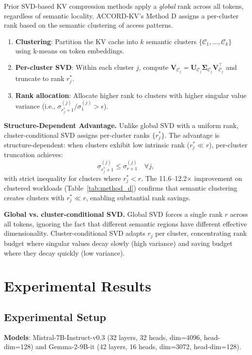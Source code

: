 \documentclass[11pt, a4paper, oneside]{article}
\theoremstyle{myplain}
\theoremstyle{mydefinition}
\theoremstyle{myremark}
\begin{document}
Prior SVD-based KV compression methods apply a \textit{global} rank across all tokens, regardless of semantic locality. ACCORD-KV's Method D assigns a per-cluster rank based on the semantic clustering of access patterns.

\begin{enumerate}
    \item \textbf{Clustering}: Partition the KV cache into $k$ semantic clusters $\{\mathcal{C}_1, \ldots, \mathcal{C}_k\}$ using k-means on token embeddings.
    \item \textbf{Per-cluster SVD}: Within each cluster $j$, compute $\mathbf{V}_{\mathcal{C}_j} = \mathbf{U}_{\mathcal{C}_j} \mathbf{\Sigma}_{\mathcal{C}_j} \mathbf{V}_{\mathcal{C}_j}^\top$ and truncate to rank $r_j^*$.
    \item \textbf{Rank allocation}: Allocate higher rank to clusters with higher singular value variance (i.e., $\sigma_{r_j^*+1}^{(j)} / \sigma_1^{(j)} > \epsilon$).
\end{enumerate}

\textbf{Structure-Dependent Advantage.} Unlike global SVD with a uniform rank, cluster-conditional SVD assigns per-cluster ranks $\{r_j^*\}$. The advantage is structure-dependent: when clusters exhibit low intrinsic rank ($r_j^* \ll r$), per-cluster truncation achieves:
\[
\sigma_{r_j^*+1}^{(j)} \leq \sigma_{r+1}^{(j)} \quad \forall j,
\]
with strict inequality for clusters where $r_j^* < r$. The 11.6--12.2× improvement on clustered workloads (Table~\ref{tab:method_d}) confirms that semantic clustering creates clusters with $r_j^* \ll r$, enabling substantial rank savings.

\textbf{Global vs. cluster-conditional SVD.} Global SVD forces a single rank $r$ across all tokens, ignoring the fact that different semantic regions have different effective dimensionality. Cluster-conditional SVD adapts $r_j$ per cluster, concentrating rank budget where singular values decay slowly (high variance) and saving budget where they decay quickly (low variance).

\section{Experimental Results}

\subsection{Experimental Setup}

\textbf{Models}: Mistral-7B-Instruct-v0.3 (32 layers, 32 heads, dim=4096, head-dim=128) and Gemma-2-9B-it (42 layers, 16 heads, dim=3072, head-dim=128).
\end{document}
